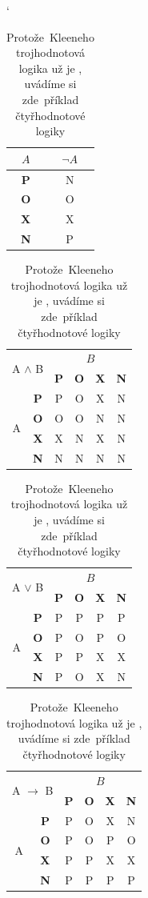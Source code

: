 \documentclass[a4paper, 11pt]{article}
\begin{document}
\begin{table}[h]
\catcode`
\bigskip
\begin{center}
\begin{tabular}{|c|c|} \hline
$A$ & $\neg A$ \\ \hline
\textbf{P} & N \\ \hline
\textbf{O} & O \\ \hline
\textbf{X} & X \\ \hline
\textbf{N} & P \\ \hline
\end{tabular}
\begin{tabular}{|c|c|c|c|c|c|} \hline
\multicolumn{2}{|l|}{\multirow{2}{*}{A $\wedge$ B}} & \multicolumn{4}{c|}{$B$}  \\ \cline{3-6} 
\multicolumn{2}{|c|}{} & \textbf{P} & \textbf{O} & \textbf{X} & \textbf{N} \\ \hline
\multirow{4}{*}{A} & \textbf{P} & P & O & X & N \\ \cline{2-6} 
 & \textbf{O} & O & O & N & N \\ \cline{2-6}  
 & \textbf{X} & X & N & X & N \\ \cline{2-6} 
 & \textbf{N} & N & N & N & N \\ \hline 
\end{tabular}
\begin{tabular}{|c|c|c|c|c|c|} \hline
\multicolumn{2}{|l|}{\multirow{2}{*}{A $\vee$ B}} & \multicolumn{4}{c|}{$B$}\\ \cline{3-6}
\multicolumn{2}{|c|}{} & \textbf{P} & \textbf{O} & \textbf{X} & \textbf{N} \\ \hline
\multirow{4}{*}{A} & \textbf{P} & P & P & P & P \\ \cline{2-6} 
 & \textbf{O} & P & O & P & O \\ \cline{2-6}  
 & \textbf{X} & P & P & X & X \\ \cline{2-6} 
 & \textbf{N} & P & O & X & N \\ \hline
\end{tabular}
\begin{tabular}{|c|c|c|c|c|c|} \hline
\multicolumn{2}{|l|}{\multirow{2}{*}{A $\rightarrow$ B}} & \multicolumn{4}{c|}{$B$}\\ \cline{3-6}
\multicolumn{2}{|c|}{} & \textbf{P} & \textbf{O} & \textbf{X} & \textbf{N} \\ \hline
\multirow{4}{*}{A} & \textbf{P} & P & O & X & N \\ \cline{2-6} 
 & \textbf{O} & P & O & P & O \\ \cline{2-6}  
 & \textbf{X} & P & P & X & X \\ \cline{2-6} 
 & \textbf{N} & P & P & P & P \\ \hline
\end{tabular}
\caption{Protože~Kleeneho trojhodnotová logika už je , uvádíme si zde~příklad čtyřhodnotové logiky} \label{tab.2}
\end{center}
\end{table}
\end{document}
